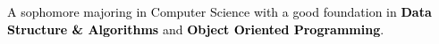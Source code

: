 \documentclass[10pt,a4paper,ragged2e,withhyper]{altacv}
\begin{document}
\begin{paracol}{2}
        
        \newpage
        
        \switchcolumn
        
            \textcolor{black}{A sophomore majoring in Computer Science with a good foundation in \textbf{Data Structure \& Algorithms} and \textbf{Object Oriented Programming}.}{}
            
        
            
        


\end{paracol}
\end{document}

